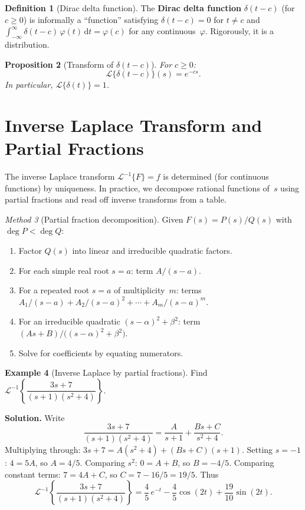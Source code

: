 \documentclass[12pt,a4paper,openany]{book}
\theoremstyle{definition}
\newtheorem{definition}{Definition}[chapter]
\newtheorem{example}[definition]{Example}
\theoremstyle{plain}
\newtheorem{proposition}[definition]{Proposition}
\theoremstyle{remark}
\newtheorem{method}[definition]{Method}
\newcommand{\dd}{\mathrm{d}}
\begin{document}
\begin{definition}[Dirac delta function]
\label{def:dirac}
The \textbf{Dirac delta function} \(\delta(t-c)\) (for \(c\ge 0\)) is
informally a ``function'' satisfying \(\delta(t-c)=0\) for \(t\neq c\) and
\(\int_{-\infty}^{\infty}\delta(t-c)\,\varphi(t)\,\dd t = \varphi(c)\) for
any continuous~\(\varphi\). Rigorously, it is a distribution.
\end{definition}

\begin{proposition}[Transform of \(\delta(t-c)\)]
\label{prop:laplace-dirac}
For \(c\ge 0\):
\[
  \mathcal{L}\{\delta(t-c)\}(s) = e^{-cs}.
\]
In particular, \(\mathcal{L}\{\delta(t)\}=1\).
\end{proposition}

\section{Inverse Laplace Transform and Partial Fractions}
\label{sec:inverse-laplace}

The inverse Laplace transform \(\mathcal{L}^{-1}\{F\}=f\) is determined
(for continuous functions) by uniqueness. In practice, we decompose rational
functions of~\(s\) using partial fractions and read off inverse transforms
from a table.

\begin{method}[Partial fraction decomposition]
\label{meth:partial-fractions}
Given \(F(s)=P(s)/Q(s)\) with \(\deg P<\deg Q\):
\begin{enumerate}[label=(\roman*)]
  \item Factor \(Q(s)\) into linear and irreducible quadratic factors.
  \item For each simple real root \(s=a\): term \(A/(s-a)\).
  \item For a repeated root \(s=a\) of multiplicity~\(m\):
    terms \(A_1/(s-a)+A_2/(s-a)^2+\cdots+A_m/(s-a)^m\).
  \item For an irreducible quadratic \((s-\alpha)^2+\beta^2\):
    term \((As+B)/\bigl((s-\alpha)^2+\beta^2\bigr)\).
  \item Solve for coefficients by equating numerators.
\end{enumerate}
\end{method}

\begin{example}[Inverse Laplace by partial fractions]
\label{ex:inverse-laplace-pf}
Find \(\mathcal{L}^{-1}\!\left\{\dfrac{3s+7}{(s+1)(s^2+4)}\right\}\).

\medskip\noindent\textbf{Solution.}
Write
\[
  \frac{3s+7}{(s+1)(s^2+4)} = \frac{A}{s+1} + \frac{Bs+C}{s^2+4}.
\]
Multiplying through: \(3s+7 = A(s^2+4)+(Bs+C)(s+1)\).
Setting \(s=-1\): \(4=5A\), so \(A=4/5\).
Comparing \(s^2\): \(0=A+B\), so \(B=-4/5\).
Comparing constant terms: \(7=4A+C\), so \(C=7-16/5=19/5\).
Thus
\[
  \mathcal{L}^{-1}\!\left\{\frac{3s+7}{(s+1)(s^2+4)}\right\}
  = \frac{4}{5}\,e^{-t} - \frac{4}{5}\cos(2t) + \frac{19}{10}\sin(2t).
\]
\end{example}
\end{document}
